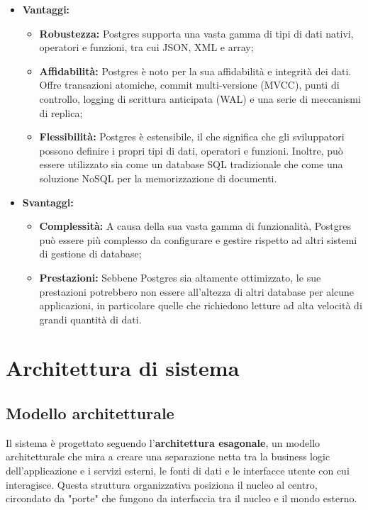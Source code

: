 \documentclass[10pt, a4paper]{article}
\begin{document}
\begin{itemize}
\item \textbf{Vantaggi:}
\begin{itemize}
\item \textbf{Robustezza:} Postgres supporta una vasta gamma di tipi di dati nativi, operatori e funzioni, tra cui JSON, XML e array;
\item \textbf{Affidabilità:} Postgres è noto per la sua affidabilità e integrità dei dati. Offre transazioni atomiche, commit multi-versione (MVCC), punti di controllo, logging di scrittura anticipata (WAL) e una serie di meccanismi di replica;
\item \textbf{Flessibilità:} Postgres è estensibile, il che significa che gli sviluppatori possono definire i propri tipi di dati, operatori e funzioni. Inoltre, può essere utilizzato sia come un database SQL tradizionale che come una soluzione NoSQL per la memorizzazione di documenti.
\end{itemize}
\item \textbf{Svantaggi:}
\begin{itemize}
\item \textbf{Complessità:} A causa della sua vasta gamma di funzionalità, Postgres può essere più complesso da configurare e gestire rispetto ad altri sistemi di gestione di database;
\item \textbf{Prestazioni:} Sebbene Postgres sia altamente ottimizzato, le sue prestazioni potrebbero non essere all'altezza di altri database per alcune applicazioni, in particolare quelle che richiedono letture ad alta velocità di grandi quantità di dati.
\end{itemize}
\end{itemize}

\newpage
\section{Architettura di sistema}
\subsection{Modello architetturale}
Il sistema è progettato seguendo l'\textbf{architettura esagonale}, un modello architetturale che mira a creare una separazione netta tra la business logic dell'applicazione e i servizi esterni, le fonti di dati e le interfacce utente con cui interagisce.
Questa struttura organizzativa posiziona il nucleo al centro, circondato da "porte" che fungono da interfaccia tra il nucleo e il mondo esterno.
\end{document}
